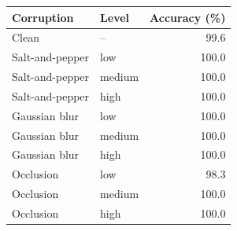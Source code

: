\begin{tabular}{llr}
\toprule
Corruption & Level & Accuracy (\%) \\
\midrule
Clean & -- & 99.6 \\
Salt-and-pepper & low & 100.0 \\
Salt-and-pepper & medium & 100.0 \\
Salt-and-pepper & high & 100.0 \\
Gaussian blur & low & 100.0 \\
Gaussian blur & medium & 100.0 \\
Gaussian blur & high & 100.0 \\
Occlusion & low & 98.3 \\
Occlusion & medium & 100.0 \\
Occlusion & high & 100.0 \\
\bottomrule
\end{tabular}
